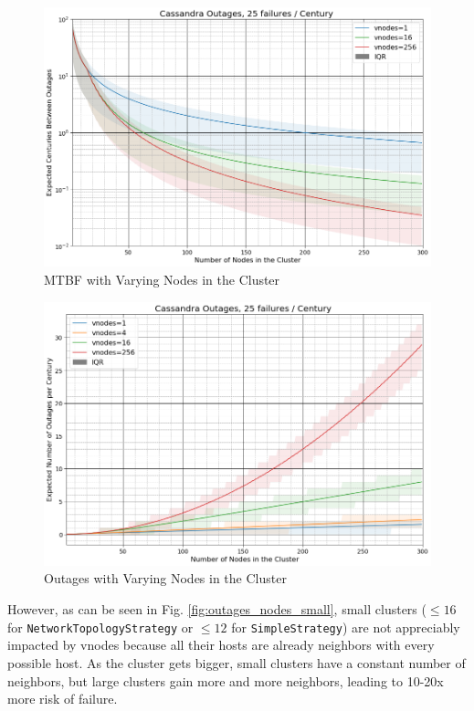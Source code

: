 \documentclass{article}
\begin{document}
\begin{figure}[h!]
    \centering
    \includegraphics[width=1.0\textwidth]{images/outages_nodes_mtbf.png}
    \caption{MTBF with Varying Nodes in the Cluster}
    \label{fig:outages_nodes_mtbf}
\end{figure}

\begin{figure}[h!]
    \centering
    \includegraphics[width=1.0\textwidth]{images/outages_nodes.png}
    \caption{Outages with Varying Nodes in the Cluster}
    \label{fig:outages_nodes}
\end{figure}

However, as can be seen in Fig. \ref{fig:outages_nodes_small}, small clusters
($\leq16$ for \texttt{NetworkTopologyStrategy} or $\leq12$ for
\texttt{SimpleStrategy}) are not appreciably impacted by vnodes because all their
hosts are already neighbors with every possible host. As the cluster gets bigger,
small clusters have a constant number of neighbors, but large clusters gain more
and more neighbors, leading to 10-20x more risk of failure.
\end{document}
